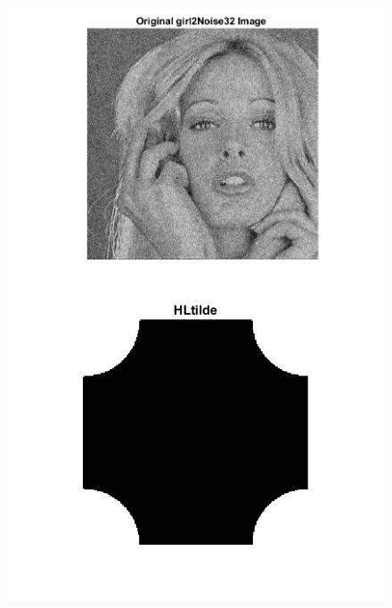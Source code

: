 \documentclass[11pt]{article} %
\begin{document}
\begin{figure}
 \centering
	\includegraphics{2bc.png}
	\includegraphics{2bd.png}
\end{figure}
\end{document}

